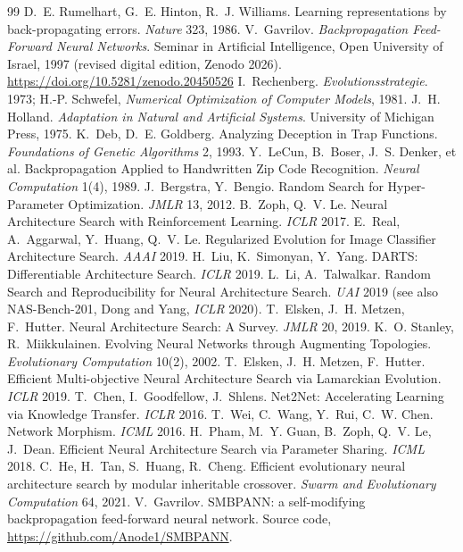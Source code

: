 \documentclass[11pt]{article}
\begin{document}
\begin{thebibliography}{99}
\small
{} D.~E. Rumelhart, G.~E. Hinton, R.~J. Williams. Learning
  representations by back-propagating errors. \emph{Nature} 323, 1986.
 V.~Gavrilov. \emph{Backpropagation Feed-Forward Neural Networks}.
  Seminar in Artificial Intelligence, Open University of Israel, 1997 (revised digital
  edition, Zenodo 2026). \url{https://doi.org/10.5281/zenodo.20450526}
 I.~Rechenberg. \emph{Evolutionsstrategie}. 1973;
  H.-P. Schwefel, \emph{Numerical Optimization of Computer Models}, 1981.
 J.~H. Holland. \emph{Adaptation in Natural and Artificial
  Systems}. University of Michigan Press, 1975.
 K.~Deb, D.~E. Goldberg. Analyzing Deception in Trap Functions.
  \emph{Foundations of Genetic Algorithms} 2, 1993.
 Y.~LeCun, B.~Boser, J.~S. Denker, et al. Backpropagation Applied to
  Handwritten Zip Code Recognition. \emph{Neural Computation} 1(4), 1989.
 J.~Bergstra, Y.~Bengio. Random Search for Hyper-Parameter
  Optimization. \emph{JMLR} 13, 2012.
 B.~Zoph, Q.~V. Le. Neural Architecture Search with Reinforcement
  Learning. \emph{ICLR} 2017.
 E.~Real, A.~Aggarwal, Y.~Huang, Q.~V. Le. Regularized Evolution for
  Image Classifier Architecture Search. \emph{AAAI} 2019.
 H.~Liu, K.~Simonyan, Y.~Yang. DARTS: Differentiable Architecture
  Search. \emph{ICLR} 2019.
 L.~Li, A.~Talwalkar. Random Search and Reproducibility for Neural
  Architecture Search. \emph{UAI} 2019 (see also NAS-Bench-201, Dong and Yang,
  \emph{ICLR} 2020).
 T.~Elsken, J.~H. Metzen, F.~Hutter. Neural Architecture Search: A
  Survey. \emph{JMLR} 20, 2019.
 K.~O. Stanley, R.~Miikkulainen. Evolving Neural Networks through
  Augmenting Topologies. \emph{Evolutionary Computation} 10(2), 2002.
 T.~Elsken, J.~H. Metzen, F.~Hutter. Efficient Multi-objective
  Neural Architecture Search via Lamarckian Evolution. \emph{ICLR} 2019.
 T.~Chen, I.~Goodfellow, J.~Shlens. Net2Net: Accelerating Learning
  via Knowledge Transfer. \emph{ICLR} 2016.
 T.~Wei, C.~Wang, Y.~Rui, C.~W. Chen. Network Morphism.
  \emph{ICML} 2016.
 H.~Pham, M.~Y. Guan, B.~Zoph, Q.~V. Le, J.~Dean. Efficient Neural
  Architecture Search via Parameter Sharing. \emph{ICML} 2018.
 C.~He, H.~Tan, S.~Huang, R.~Cheng. Efficient evolutionary neural
  architecture search by modular inheritable crossover. \emph{Swarm and Evolutionary
  Computation} 64, 2021.
 V.~Gavrilov. SMBPANN: a self-modifying backpropagation feed-forward
  neural network. Source code, \url{https://github.com/Anode1/SMBPANN}.
\end{thebibliography}
\end{document}
